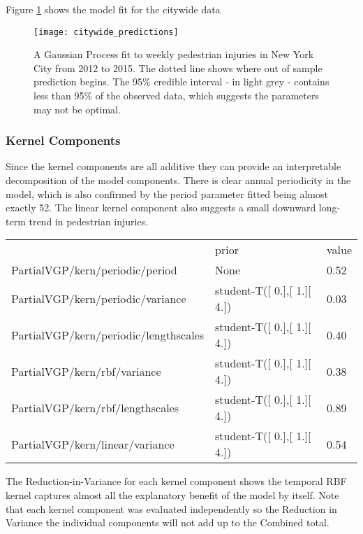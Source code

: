  Figure \ref{city_preds} shows the model fit for the citywide data

 \begin{figure}[h!]
   \centering
   \caption{A Gaussian Process fit to weekly pedestrian injuries in New York City from 2012 to 2015. The dotted line shows where out of sample prediction begins. The 95\% credible interval - in light grey - contains less than 95\% of the observed data, which suggests the parameters may not be optimal.}
   \texttt{[image: citywide\_predictions]}
   \label{city_preds}
 \end{figure}


\subsubsection{Kernel Components}

Since the kernel components are all additive they can provide an interpretable decomposition of the model components. There is clear annual periodicity in the model, which is also confirmed by the period parameter fitted being almost exactly 52. The linear kernel component also suggests a small downward long-term trend in pedestrian injuries.

\begin{table}[]
\centering
\label{citywide_parameters}
\begin{tabular}{lll}
                                      & prior                                   & value \\
PartialVGP/kern/periodic/period       & None                                    & 0.52 \\
PartialVGP/kern/periodic/variance     & student-T({[} 0.{]},{[} 1.{]}{[} 4.{]}) & 0.03  \\
PartialVGP/kern/periodic/lengthscales & student-T({[} 0.{]},{[} 1.{]}{[} 4.{]}) & 0.40  \\
PartialVGP/kern/rbf/variance          & student-T({[} 0.{]},{[} 1.{]}{[} 4.{]}) & 0.38  \\
PartialVGP/kern/rbf/lengthscales      & student-T({[} 0.{]},{[} 1.{]}{[} 4.{]}) & 0.89  \\
PartialVGP/kern/linear/variance       & student-T({[} 0.{]},{[} 1.{]}{[} 4.{]}) & 0.54
\end{tabular}
\end{table}



The Reduction-in-Variance for each kernel component shows the temporal RBF kernel captures almost all the explanatory benefit of the model by itself. Note that each kernel component was evaluated independently so the Reduction in Variance the individual components will not add up to the Combined total. \par

